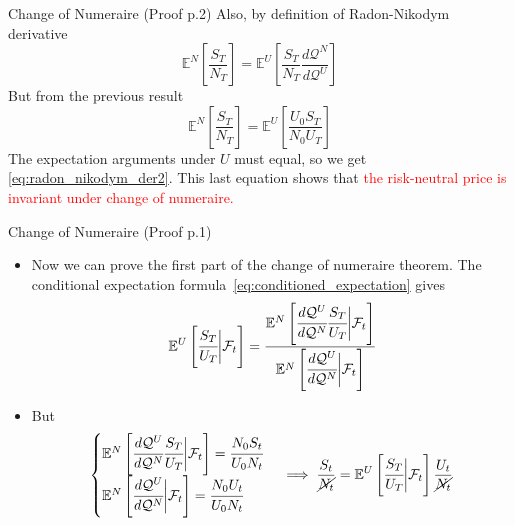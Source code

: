 \documentclass{beamer}
\begin{document}
\begin{frame}{Change of Numeraire (Proof p.2)}
  Also, by definition of Radon-Nikodym derivative
  \begin{equation*}
    \mathbb{E}^N\left[\frac{S_T}{N_T}\right] = \mathbb{E}^U\left[\frac{S_T}{N_T} \frac{d\mathcal{Q}^N}{d\mathcal{Q}^U}\right]
  \end{equation*}
	\pause
  But from the previous result
  \begin{equation*}
    \mathbb{E}^N\left[\frac{S_T}{N_T}\right] = \mathbb{E}^U\left[\frac{U_0 S_T}{N_0 U_T}\right]
  \end{equation*}
  The expectation arguments under $U$ must equal, so we get \cref{eq:radon_nikodym_der2}. 
  \pause
  This last equation shows that \textcolor{red}{the risk-neutral price is invariant under change of numeraire.}
\end{frame}

\begin{frame}{Change of Numeraire (Proof p.1)}
  \begin{itemize}
  \item<1-> Now we can prove the first part of the change of numeraire theorem. The conditional expectation formula~\cref{eq:conditioned_expectation} gives
    \begin{equation*}
      \mathbb{E}^U\left[\cfrac{S_T}{U_T}\bigg|\mathcal{F}_t\right]=\cfrac{\mathbb{E}^N\left[\cfrac{d\mathcal{Q}^U}{d\mathcal{Q}^N}\cfrac{S_T}{U_T}\bigg|\mathcal{F}_t\right]}{\mathbb{E}^N\left[\cfrac{d\mathcal{Q}^U}{d\mathcal{Q}^N}\bigg|\mathcal{F}_t\right]}
    \end{equation*}
  \item<2-> But 
    \begin{equation*}
      \begin{cases}
	\mathbb{E}^N\left[\cfrac{d\mathcal{Q}^U}{d\mathcal{Q}^N}\cfrac{S_T}{U_T}\bigg|\mathcal{F}_t\right]=\cfrac{N_0 S_t}{U_0 N_t} \\
	\mathbb{E}^N\left[\cfrac{d\mathcal{Q}^U}{d\mathcal{Q}^N}\bigg|\mathcal{F}_t\right]=\cfrac{N_0 U_t}{U_0 N_t}
      \end{cases}\implies
      \frac{S_t}{\cancel{N_t}}=\mathbb{E}^U\left[\cfrac{S_T}{U_T}\bigg|\mathcal{F}_t\right]\frac{U_t}{\cancel{N_t}}
    \end{equation*}
  \end{itemize}
\end{frame}	
\end{document}
